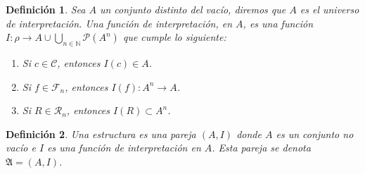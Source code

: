 \documentclass[fc]{tarea}
\newtheorem{definition}{Definición}[chapter]
\begin{document}
\begin{definition}
  Sea $A$ un conjunto distinto del vacío, diremos que $A$ es el universo de interpretación. Una función de interpretación, en $A$, es una función 
  $I:\rho \to A \cup \bigcup_{n \in \mathbb{N}} \mathcal{P}(A^n)$ que cumple lo siguiente:
  \begin{enumerate}
    \item Si $c \in \mathcal{C}$, entonces $I(c)\in A$.
    \item Si $f \in \mathcal{F}_n$, entonces $I(f): A^n \to A$.
    \item Si $R \in \mathcal{R}_n$, entonces $I(R)\subset A^n$.
  \end{enumerate}
\end{definition}

\begin{definition}
  Una estructura es una pareja $(A, I)$ donde $A$ es un conjunto no vacío e $I$ es una función de interpretación en $A$. Esta pareja se denota $\mathfrak{A} = (A,I)$.
\end{definition}
\end{document}
